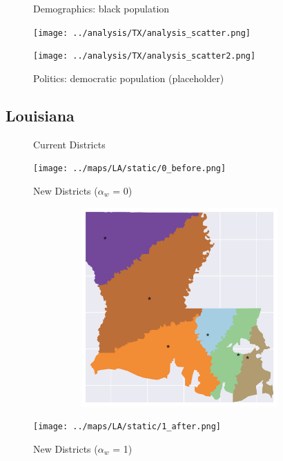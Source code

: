 \clearpage
\newpage

\begin{figure}[htb!] \centering
\caption{ Demographics: black population }
\texttt{[image: ../analysis/TX/analysis\_scatter.png]}
\caption{ Politics: democratic population (placeholder)}
\texttt{[image: ../analysis/TX/analysis\_scatter2.png]}
\end{figure}

\clearpage
\newpage

\subsection{Louisiana}
\begin{figure}[htb!] \centering
\caption{ Current Districts }
\texttt{[image: ../maps/LA/static/0\_before.png]}
\caption{ New Districts ($\alpha_w$ = 0) }
\includegraphics[width=5in,height=3in,keepaspectratio]{../maps/LA/static/0_after.png}
\caption{ New Districts ($\alpha_w$ = 1) }
\texttt{[image: ../maps/LA/static/1\_after.png]}
\end{figure}

\clearpage
\newpage

